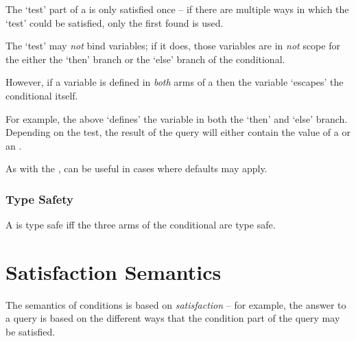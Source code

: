 \begin{aside}
\begin{aside}
The `test' part of a  is only satisfied once -- if there are multiple ways in which the `test' could be satisfied, only the first found is used.

The `test' may \emph{not} bind variables; if it does, those variables are in \emph{not} scope for the either the `then' branch or the `else' branch of the conditional.
\end{aside}
\end{aside}
\begin{aside}
\begin{aside}
However, if a variable is defined in \emph{both} arms of a  then the variable `escapes' the conditional itself. 

For example, the  above `defines' the variable  in both the `then' and `else' branch. Depending on the  test, the result of the query will either contain the value of a  or an .
\end{aside}
\end{aside}

\begin{aside}
As with the ,  can be useful in cases where defaults may apply.
\end{aside}

\subsubsection{Type Safety}
A  is type safe iff the three arms of the conditional are type safe.
\begin{prooftree}
\end{prooftree}

\section{Satisfaction Semantics}
\label{querySemantics}

The semantics of conditions is based on \emph{satisfaction} -- for example, the answer to a query is based on the different ways that the condition part of the query may be satisfied. 

